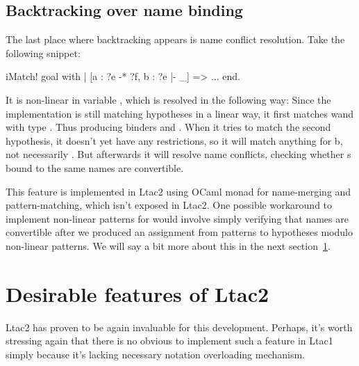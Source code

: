 \subsection{Backtracking over name binding}

The last place where backtracking appears is name conflict resolution.
Take the following snippet:

\begin{coq}
iMatch! goal with
| [a : ?e -* ?f, b : ?e |- _] => ...
end.
\end{coq}

It is non-linear in variable , which is resolved in the following way:
Since the implementation is still matching hypotheses in a linear way, it first matches wand  with type .
Thus producing binders  and .
When it tries to match the second hypothesis, it doesn't yet have any restrictions, so it will match anything for b, not necessarily .
But afterwards it will resolve name conflicts, checking whether s bound to the same names are convertible.

This feature is implemented in Ltac2 using OCaml monad for name-merging and pattern-matching, which isn't exposed in Ltac2.
One possible workaround to implement non-linear patterns for  would involve simply verifying that names are convertible after we produced an assignment from patterns to hypotheses modulo non-linear patterns.
We will say a bit more about this in the next section~\ref{sec:desir-feat-ltac2-five}.

\section{Desirable features of Ltac2}
\label{sec:desir-feat-ltac2-five}

Ltac2 has proven to be again invaluable for this development.
Perhaps, it's worth stressing again that there is no obvious to implement such a feature in Ltac1 simply because it's lacking necessary notation overloading mechanism.


